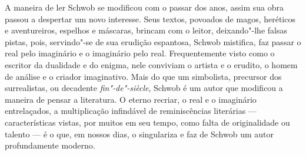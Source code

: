 A maneira de ler Schwob se modificou com o passar dos anos, assim sua obra
passou a despertar um novo interesse. Seus textos, povoados de magos, heréticos
e aventureiros, espelhos e máscaras, brincam com o leitor, deixando"-lhe falsas
pistas, pois, servindo"-se de sua erudição espantosa, Schwob mistifica, faz
passar o real pelo imaginário e o imaginário pelo real. Frequentemente visto
como o escritor da dualidade e do enigma, nele conviviam o artista e o erudito,
o homem de análise e o criador imaginativo. Mais do que um simbolista,
precursor dos surrealistas, ou decadente \textit{fin"-de"-siècle}, Schwob é
um autor que modificou a maneira de pensar a literatura. O eterno
recriar, o real e o imaginário entrelaçados, a multiplicação infindável de
reminiscências literárias --- características vistas, por muitos em seu tempo,
como falta de originalidade ou talento --- é o que, em nossos dias, o singulariza
e faz de Schwob um autor profundamente moderno.